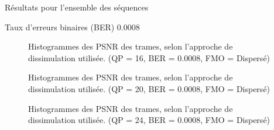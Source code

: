 \begin{section}{Résultats pour l'ensemble des séquences}
\begin{subsection}{Taux d'erreurs binaires (BER) 0.0008}
\begin{figure} 
\caption[]{Histogrammes des PSNR des trames, selon l'approche de dissimulation
utilisée. (QP = 16, BER = 0.0008, FMO = Dispersé)}
\label{fig-HistAllDispersed16x8}
\end{figure}

\begin{figure} 
\caption[]{Histogrammes des PSNR des trames, selon l'approche de dissimulation
utilisée. (QP = 20, BER = 0.0008, FMO = Dispersé)}
\label{fig-HistAllDispersed20x8}
\end{figure}

\begin{figure} 
\caption[]{Histogrammes des PSNR des trames, selon l'approche de dissimulation
utilisée. (QP = 24, BER = 0.0008, FMO = Dispersé)}
\label{fig-HistAllDispersed24x8}
\end{figure}


\end{subsection}
\end{section}
